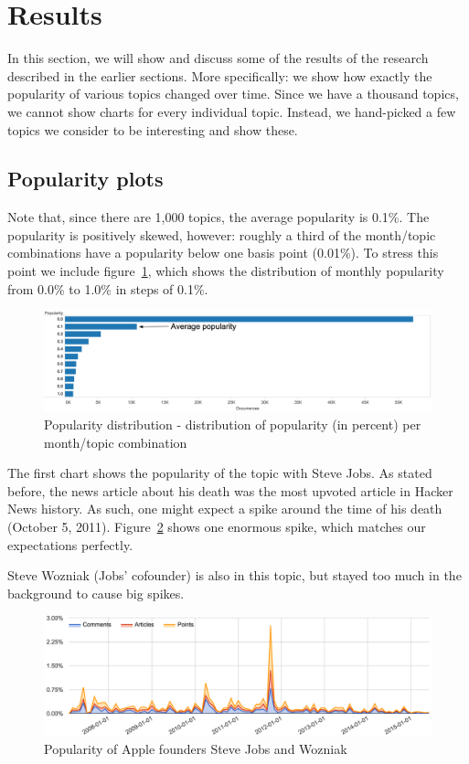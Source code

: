 \section{Results}
\label{sec:results}
In this section, we will show and discuss some of the results of the research described in the earlier sections. More specifically: we show how exactly the popularity of various topics changed over time. Since we have a thousand topics, we cannot show charts for every individual topic. Instead, we hand-picked a few topics we consider to be interesting and show these. 

\subsection{Popularity plots}
Note that, since there are 1,000 topics, the average popularity is 0.1\%. The popularity is positively skewed, however: roughly a third of the month/topic combinations have a popularity below one basis point (0.01\%). To stress this point we include figure~\ref{fig:popularitydistribution}, which shows the distribution of monthly popularity from 0.0\% to 1.0\% in steps of 0.1\%.

\begin{figure}[H]
	\caption{Popularity distribution - distribution of popularity (in percent) per month/topic combination}
	\label{fig:popularitydistribution}
	\centering
	\includegraphics[width=14cm]{popularity_distribution}
\end{figure}

The first chart shows the popularity of the topic with Steve Jobs. As stated before, the news article about his death was the most upvoted article in Hacker News history. As such, one might expect a spike around the time of his death (October 5, 2011). Figure~\ref{fig:trend_jobs} shows one enormous spike, which matches our expectations perfectly.

Steve Wozniak (Jobs' cofounder) is also in this topic, but stayed too much in the background to cause big spikes.
\begin{figure}[H] %
	\caption{Popularity of Apple founders Steve Jobs and Wozniak}
	\label{fig:trend_jobs}
	\centering
	\includegraphics[width=14cm]{topic_trends/jobs_relative}
\end{figure}

